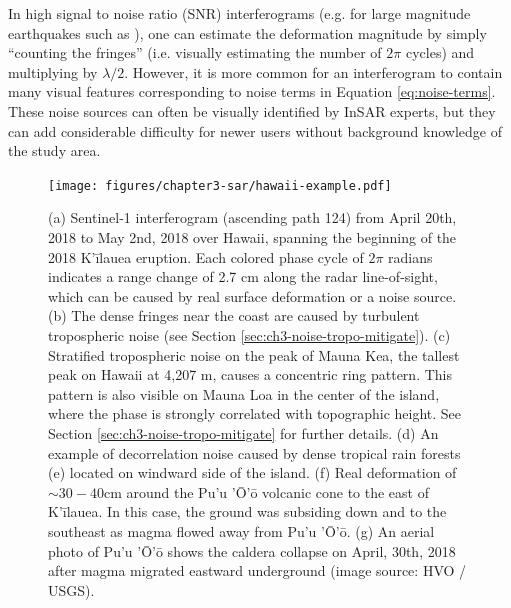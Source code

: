In high signal to noise ratio (SNR) interferograms (e.g. for large magnitude earthquakes such as \cite{Massonnet1993DisplacementFieldLanders}), one can estimate the deformation magnitude by simply ``counting the fringes'' (i.e. visually estimating the number of $ 2 \pi $ cycles) and multiplying by $\lambda/2$. However, it is more common for an interferogram to contain many visual features corresponding to noise terms in Equation \eqref{eq:noise-terms}. These noise sources can often be visually identified by InSAR experts, but they can add considerable difficulty for newer users without background knowledge of the study area.

\begin{figure}[!htbp]
	\centering
	\texttt{[image: figures/chapter3-sar/hawaii-example.pdf]}
	\caption[Sentinel-1 interferogram over Hawaii showing common noise sources, along with 2018 eruption deformation]{
		(a) Sentinel-1 interferogram (ascending path 124) from April 20th, 2018 to May 2nd, 2018 over Hawaii, spanning the beginning of the 2018 K'\=ilauea eruption.
		Each colored phase cycle of $2\pi$ radians indicates a range change of 2.7 cm along the radar line-of-sight, which can be caused by real surface deformation or a noise source.
		(b) The dense fringes near the coast are caused by turbulent tropospheric noise (see Section \ref{sec:ch3-noise-tropo-mitigate}).
		(c) Stratified tropospheric noise on the peak of Mauna Kea, the tallest peak on Hawaii at 4,207 m, causes a concentric ring pattern. This pattern is also visible on Mauna Loa in the center of the island, where the phase is strongly correlated with topographic height. See Section \ref{sec:ch3-noise-tropo-mitigate} for further details.
		(d) An example of decorrelation noise caused by dense tropical rain forests (e) located on windward side of the island.
		(f) Real deformation of $ \sim 30-40 $cm around the Pu'u '\=O'\=o volcanic cone to the east of K'\=ilauea. In this case, the ground was subsiding down and to the southeast as magma flowed away from Pu'u '\=O'\=o.
		(g) An aerial photo of Pu'u '\=O'\=o shows the caldera collapse on April, 30th, 2018 after magma migrated eastward underground (image source: HVO / USGS).
	}
	\label{fig:ch3-hawaii-example}
\end{figure}

